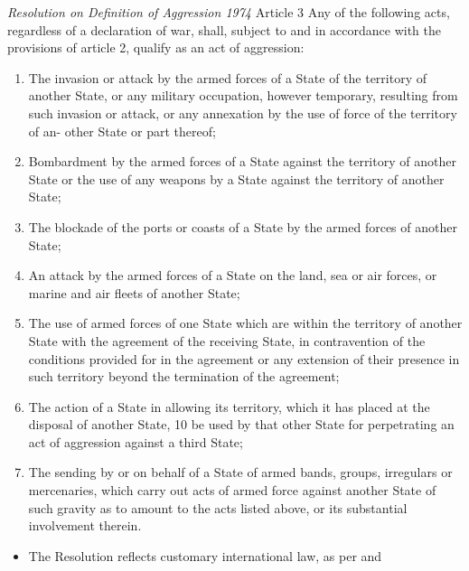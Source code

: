 \begin{conventiondetails}{\textit{Resolution on Definition of Aggression 1974} Article 3}
    \flushleft
    Any of the following acts, regardless of a declaration of war, shall, subject to and in accordance with the provisions of article 2, qualify as an act of aggression:

    \begin{enumerate}[label=(\alph*)]
        \item The invasion or attack by the armed forces of a State of the territory of another State, or any military occupation, however temporary, resulting from such invasion or attack, or any annexation by the use of force of the territory of an- other State or part thereof;
        \item Bombardment by the armed forces of a State against the territory of another State or the use of any weapons by a State against the territory of another State;
        \item The blockade of the ports or coasts of a State by the armed forces of another State;
        \item An attack by the armed forces of a State on the land, sea or air forces, or marine and air fleets of another State;
        \item The use of armed forces of one State which are within the territory of another State with the agreement of the receiving State, in contravention of the conditions provided for in the agreement or any extension of their presence in such territory beyond the termination of the agreement;
        \item The action of a State in allowing its territory, which it has placed at the disposal of another State, 10 be used by that other State for perpetrating an act of aggression against a third State;
        \item The sending by or on behalf of a State of armed bands, groups, irregulars or mercenaries, which carry out acts of armed force against another State of such gravity as to amount to the acts listed above, or its substantial involvement therein.
    \end{enumerate}
\end{conventiondetails}

\begin{itemize}
    \item The Resolution reflects customary international law, as per  and 
\end{itemize}

